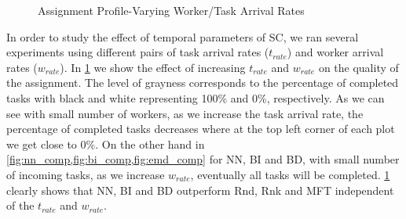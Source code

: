 \begin{figure}[h]
{    }
    \vspace{-0.15in}
    \caption{\small{Assignment Profile-Varying Worker/Task Arrival Rates}}
    \label{fig:tw_rate}
\end{figure}

In order to study the effect of temporal parameters of SC, we ran several experiments using different pairs of task arrival rates ($t_{rate}$) and worker arrival rates ($w_{rate}$). In \cref{fig:tw_rate} we show the effect of increasing $t_{rate}$ and $w_{rate}$ on the quality of the assignment. The level of grayness corresponds to the percentage of completed tasks with black and white representing 100\% and 0\%, respectively. As we can see with small number of workers, as we increase the task arrival rate, the percentage of completed tasks decreases where at the top left corner of each plot we get close to 0\%. On the other hand in \cref{fig:nn_comp,fig:bi_comp,fig:emd_comp} for NN, BI and BD, with small number of incoming tasks, as we increase $w_{rate}$, eventually all tasks will be completed. \cref{fig:tw_rate} clearly shows that NN, BI and BD outperform Rnd, Rnk and MFT independent of the $t_{rate}$ and $w_{rate}$.

